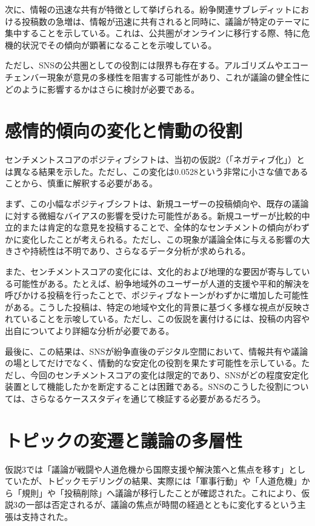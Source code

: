 \documentclass[11pt, a4j]{jreport}
\begin{document}
    次に、情報の迅速な共有が特徴として挙げられる。紛争関連サブレディットにおける投稿数の急増は、情報が迅速に共有されると同時に、議論が特定のテーマに集中することを示している。これは、公共圏がオンラインに移行する際、特に危機的状況でその傾向が顕著になることを示唆している。
    
    ただし、SNSの公共圏としての役割には限界も存在する。アルゴリズムやエコーチェンバー現象\citep{pariser2011filter}が意見の多様性を阻害する可能性があり、これが議論の健全性にどのように影響するかはさらに検討が必要である。

    \section{感情的傾向の変化と情動の役割}
    センチメントスコアのポジティブシフトは、当初の仮説2（「ネガティブ化」）とは異なる結果を示した。ただし、この変化は0.0528という非常に小さな値であることから、慎重に解釈する必要がある。
    
    まず、この小幅なポジティブシフトは、新規ユーザーの投稿傾向や、既存の議論に対する微細なバイアスの影響を受けた可能性がある。新規ユーザーが比較的中立的または肯定的な意見を投稿することで、全体的なセンチメントの傾向がわずかに変化したことが考えられる。ただし、この現象が議論全体に与える影響の大きさや持続性は不明であり、さらなるデータ分析が求められる。
    
    また、センチメントスコアの変化には、文化的および地理的な要因が寄与している可能性がある。たとえば、紛争地域外のユーザーが人道的支援や平和的解決を呼びかける投稿を行ったことで、ポジティブなトーンがわずかに増加した可能性がある。こうした投稿は、特定の地域や文化的背景に基づく多様な視点が反映されていることを示唆している。ただし、この仮説を裏付けるには、投稿の内容や出自についてより詳細な分析が必要である。
    
    最後に、この結果は、SNSが紛争直後のデジタル空間において、情報共有や議論の場としてだけでなく、情動的な安定化の役割を果たす可能性を示している。ただし、今回のセンチメントスコアの変化は限定的であり、SNSがどの程度安定化装置として機能したかを断定することは困難である。SNSのこうした役割については、さらなるケーススタディを通じて検証する必要があるだろう。

    \section{トピックの変遷と議論の多層性}
    仮説3では「議論が戦闘や人道危機から国際支援や解決策へと焦点を移す」としていたが、トピックモデリングの結果、実際には「軍事行動」や「人道危機」から「規則」や「投稿削除」へ議論が移行したことが確認された。これにより、仮説3の一部は否定されるが、議論の焦点が時間の経過とともに変化するという主張は支持された。
    
\end{document}
